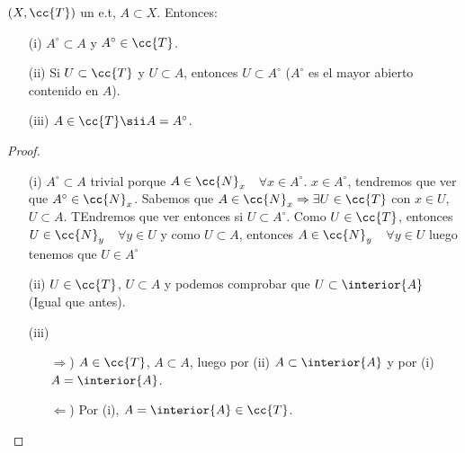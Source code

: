 \begin{propiedades}$(X, \cc{T})$ un e.t, $A\subset X$. Entonces:
    \begin{enumerate}
        \item[(i)] $A^\circ \subset A$ y $A^\circ \in \cc{T}$.
        \item[(ii)] Si $U \subset \cc{T}$ y $U \subset A$, entonces $U \subset A^\circ$ ($A^\circ$ es el mayor abierto contenido en $A$).
        \item[(iii)] $A\in \cc{T} \sii A = A^\circ$. 
    \end{enumerate}

    \begin{proof}\
        \begin{itemize}
            \item[(i)] $A^\circ\subset A$ trivial porque $A \in \cc{N}_x$\ \ $\forall x \in A^\circ$. $x\in A^\circ$, tendremos que ver que $A^\circ\in \cc{N}_x$. Sabemos que $A\in \cc{N}_x \Rightarrow \exists U \in \cc{T}$ con $x\in U$, $U\subset A$. TEndremos que ver entonces si $U\subset A^\circ$. Como $U\in \cc{T}$, entonces $U\in \cc{N}_y$\ \ $\forall y \in U$ y como $U\subset A$, entonces $A\in \cc{N}_y$\ \ $\forall y \in U$ luego tenemos que $U \in A^\circ$
            \item[(ii)] $U \in \cc{T}$, $U\subset A$ y podemos comprobar que $U\subset \interior{A}$ (Igual que antes).
            \item[(iii)] \begin{itemize}
                \item[$\Rightarrow$)] $A\in \cc{T}$, $A\subset A$, luego por (ii) $A\subset \interior{A}$ y por (i) $A=\interior{A}$.
                \item[$\Leftarrow$)] Por (i), $A=\interior{A}\in \cc{T}$. 
            \end{itemize}  
        \end{itemize}
    \end{proof}
    
\end{propiedades}


